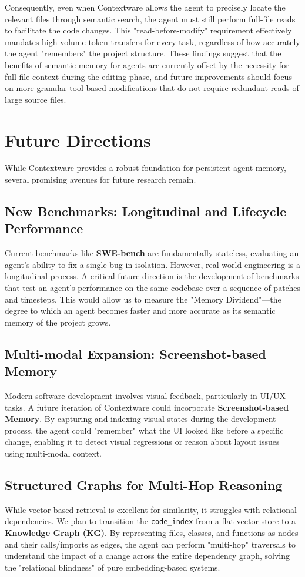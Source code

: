 \documentclass[conference]{IEEEtran}
\begin{document}
Consequently, even when Contextware allows the agent to precisely locate the relevant files through semantic search, the agent must still perform full-file reads to facilitate the code changes. This "read-before-modify" requirement effectively mandates high-volume token transfers for every task, regardless of how accurately the agent "remembers" the project structure. These findings suggest that the benefits of semantic memory for agents are currently offset by the necessity for full-file context during the editing phase, and future improvements should focus on more granular tool-based modifications that do not require redundant reads of large source files.

\section{Future Directions}
While Contextware provides a robust foundation for persistent agent memory, several promising avenues for future research remain.

\subsection{New Benchmarks: Longitudinal and Lifecycle Performance}
Current benchmarks like \textbf{SWE-bench} are fundamentally stateless, evaluating an agent's ability to fix a single bug in isolation. However, real-world engineering is a longitudinal process. A critical future direction is the development of benchmarks that test an agent's performance on the same codebase over a sequence of patches and timesteps. This would allow us to measure the "Memory Dividend"—the degree to which an agent becomes faster and more accurate as its semantic memory of the project grows.

\subsection{Multi-modal Expansion: Screenshot-based Memory}
Modern software development involves visual feedback, particularly in UI/UX tasks. A future iteration of Contextware could incorporate \textbf{Screenshot-based Memory}. By capturing and indexing visual states during the development process, the agent could "remember" what the UI looked like before a specific change, enabling it to detect visual regressions or reason about layout issues using multi-modal context.

\subsection{Structured Graphs for Multi-Hop Reasoning}
While vector-based retrieval is excellent for similarity, it struggles with relational dependencies. We plan to transition the \texttt{code\_index} from a flat vector store to a \textbf{Knowledge Graph (KG)}. By representing files, classes, and functions as nodes and their calls/imports as edges, the agent can perform "multi-hop" traversals to understand the impact of a change across the entire dependency graph, solving the "relational blindness" of pure embedding-based systems.
\end{document}
